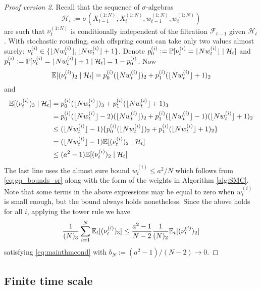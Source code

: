 \newpage
\begin{proof}[Proof version 2]
Recall that the sequence of $\sigma$-algebras
\begin{equation}\label{eq:defn_Ht}
\mathcal{H}_t := \sigma(X_{t-1}^{(1:N)}, X_t^{(1:N)}, w_{t-1}^{(1:N)}, w_t^{(1:N)} )
\end{equation}
are such that $\nu_t^{(1:N)}$ is conditionally independent of the filtration $\mathcal{F}_{t-1}$ given $\mathcal{H}_t$.
With stochastic rounding, each offspring count can take only two values almost surely: $\nu_t^{(i)} \in \{\lfloor N w_t^{(i)} \rfloor, \lfloor N w_t^{(i)} \rfloor +1\}$.  
Denote $p_0^{(i)} := \mathbb{P}[ \nu_t^{(i)} = \lfloor N w_t^{(i)} \rfloor \mid \mathcal{H}_t ]$ and $p_1^{(i)} := \mathbb{P}[ \nu_t^{(i)} = \lfloor N w_t^{(i)} \rfloor +1 \mid \mathcal{H}_t ] = 1-p_0^{(i)}$.
Now
\begin{equation*}
\mathbb{E} [(\nu_t^{(i)})_2 \mid \mathcal{H}_t ]
= p_0^{(i)} (\lfloor N w_t^{(i)} \rfloor)_2 + p_1^{(i)} (\lfloor N w_t^{(i)} \rfloor +1)_2
\end{equation*}
and
\begin{align*}
\mathbb{E} [(\nu_t^{(i)})_3 \mid \mathcal{H}_t ]
&= p_0^{(i)} (\lfloor N w_t^{(i)} \rfloor)_3 + p_1^{(i)} (\lfloor N w_t^{(i)} \rfloor +1)_3 \\
&= p_0^{(i)} (\lfloor N w_t^{(i)} \rfloor -2)(\lfloor N w_t^{(i)} \rfloor)_2 + p_1^{(i)} (\lfloor N w_t^{(i)} \rfloor -1)(\lfloor N w_t^{(i)} \rfloor +1)_2 \\
&\leq (\lfloor N w_t^{(i)} \rfloor -1) \{ p_0^{(i)} (\lfloor N w_t^{(i)} \rfloor)_2 + p_1^{(i)} (\lfloor N w_t^{(i)} \rfloor +1)_2 \} \\
&= (\lfloor N w_t^{(i)} \rfloor -1) \mathbb{E} [(\nu_t^{(i)})_2 \mid \mathcal{H}_t ] \\
&\leq (a^2 -1) \mathbb{E} [(\nu_t^{(i)})_2 \mid \mathcal{H}_t ]
\end{align*}
The last line uses the almost sure bound $w_t^{(i)} \leq a^2 /N$ which follows from \eqref{eq:gq_bounds_sr} along with the form of the weights in Algorithm \ref{alg:SMC}.
Note that some terms in the above expressions may be equal to zero when $w_t^{(i)}$ is small enough, but the bound always holds nonetheless.
Since the above holds for all $i$, applying the tower rule we have
\begin{equation*}
\frac{1}{(N)_3} \sum_{i=1}^{N} \mathbb{E}_t [(\nu_t^{(i)})_3 ]
\leq \frac{a^2-1}{N-2} \frac{1}{(N)_2} \mathbb{E}_t [(\nu_t^{(i)})_2 ]
\end{equation*}
satisfying \eqref{eq:mainthmcond} with $b_N := (a^2-1)/(N-2) \rightarrow 0$.
\end{proof}


\subsection{Finite time scale}


